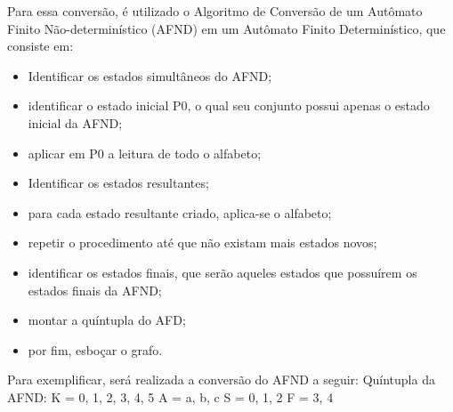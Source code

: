 \documentclass[a4paper,10pt]{article} %
\begin{document}
    Para essa conversão, é utilizado o Algoritmo de Conversão de um Autômato Finito Não-determinístico (AFND) em um Autômato Finito Determinístico, que consiste em:
    \begin{itemize}
        \item Identificar os estados simultâneos do AFND;
        \item identificar o estado inicial P0, o qual seu conjunto possui apenas o estado inicial da AFND;
        \item aplicar em P0 a leitura de todo o alfabeto;
        \item Identificar os estados resultantes;
        \item para cada estado resultante criado, aplica-se o alfabeto;
        \item repetir o procedimento até que não existam mais estados novos;
        \item identificar os estados finais, que serão aqueles estados que possuírem os estados finais da AFND;     
        \item montar a quíntupla do AFD;     
        \item por fim, esboçar o grafo.    
    \end{itemize}
    Para exemplificar, será realizada a conversão do AFND a seguir:
        Quíntupla da AFND:
        K = {0, 1, 2, 3, 4, 5}
        A = {a, b, c}
        S = {0, 1, 2}
        F = {3, 4}
    \begin{center}
    \end{center}
\end{document}
